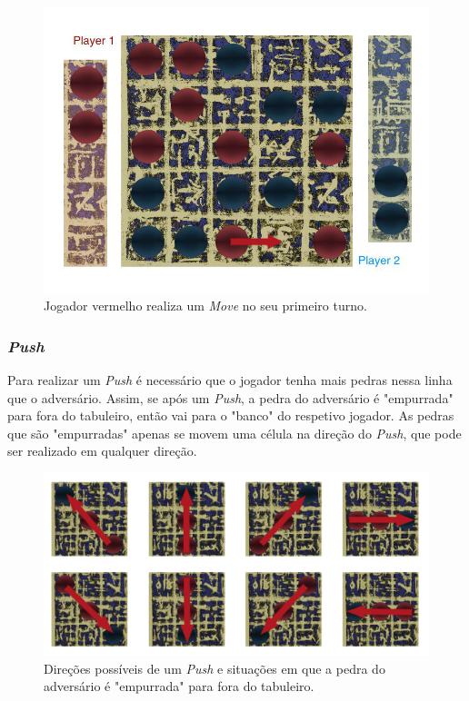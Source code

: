 \documentclass[a4paper]{article}
\begin{document}
\begin{figure}[!htb]
	\centering
	\includegraphics[scale=0.3]{images/first_move.png}
	\caption{Jogador vermelho realiza um \textit{Move} no seu primeiro turno.}
\end{figure}

\newpage

\subsubsection{\textit{Push}}

Para realizar um  \textit{Push} é necessário que o jogador tenha mais pedras nessa linha que o adversário. Assim, se após um  \textit{Push}, a pedra do adversário é "empurrada" para fora do tabuleiro, então vai para o "banco" do respetivo jogador. As pedras que são "empurradas" apenas se movem uma célula na direção do \textit{Push}, que pode ser realizado em qualquer direção.

\begin{figure}[!htb]
	\centering
	\includegraphics[scale=0.3]{images/push_dirs.png} 
	\caption{Direções possíveis de um \textit{Push} e situações em que a pedra do adversário é "empurrada" para fora do tabuleiro.}
\end{figure}
\end{document}
